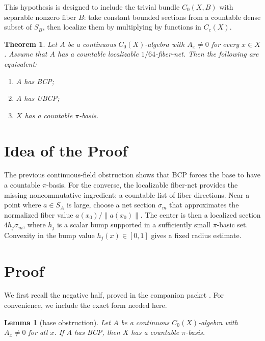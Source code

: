 \documentclass[11pt]{article}
\newtheorem{theorem}{Theorem}
\newtheorem{lemma}{Lemma}
\begin{document}
This hypothesis is designed to include the trivial bundle \(C_0(X,B)\) with
separable nonzero fiber \(B\): take constant bounded sections from a countable
dense subset of \(S_B\), then localize them by multiplying by functions in
\(C_c(X)\).

\begin{theorem}
\label{thm:fibernet}
Let \(A\) be a continuous \(C_0(X)\)-algebra with \(A_x\ne0\) for every
\(x\in X\).  Assume that \(A\) has a countable localizable
\(1/64\)-fiber-net.  Then the following are equivalent:
\begin{enumerate}
    \item \(A\) has BCP;
    \item \(A\) has UBCP;
    \item \(X\) has a countable \(\pi\)-basis.
\end{enumerate}
\end{theorem}

\section*{Idea of the Proof}

The previous continuous-field obstruction shows that BCP forces the base to
have a countable \(\pi\)-basis.  For the converse, the localizable fiber-net
provides the missing noncommutative ingredient: a countable list of fiber
directions.  Near a point where \(a\in S_A\) is large, choose a net section
\(\sigma_m\) that approximates the normalized fiber value \(a(x_0)/\|a(x_0)\|\).
The center is then a localized section \(4h_j\sigma_m\), where \(h_j\) is a
scalar bump supported in a sufficiently small \(\pi\)-basic set.  Convexity in
the bump value \(h_j(x)\in[0,1]\) gives a fixed radius estimate.

\section*{Proof}

We first recall the negative half, proved in the companion packet
\cite{lane19base}.  For convenience, we include the exact form needed here.

\begin{lemma}[base obstruction]
\label{lem:base}
Let \(A\) be a continuous \(C_0(X)\)-algebra with \(A_x\ne0\) for all \(x\).
If \(A\) has BCP, then \(X\) has a countable \(\pi\)-basis.
\end{lemma}
\end{document}
